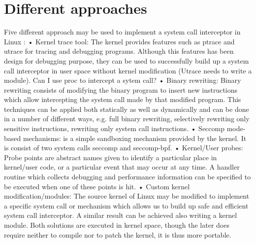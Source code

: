 \section{Different approaches }
Five different approach may be used to implement a system call interceptor in Linux :
•	Kernel trace tool:  The kernel provides features such as ptrace and utrace for tracing and debugging programs. Although this features has been design for debugging purpose, they can be used to successfully build up a system call interceptor in user space without kernel modification (Utrace needs to write a module). Can I use proc to intercept a sytem call?  
•	Binary rewriting:  Binary rewriting consists of modifying the binary program to insert new instructions which allow intercepting the system call made by that modified program. This techniques can be applied both statically as well as dynamically and can be done in a number of different ways, e.g. full binary rewriting, selectively rewriting only sensitive instructions, rewriting only system call instructions.
•	Seccomp mode-based mechanisms: is a simple sandboxing mechanism provided by the kernel. It is consist of two system calls seccomp and seccomp-bpf. 
•	Kernel/User probes: Probe points are abstract names given to identify a particular place in kernel/user code, or a particular event that may occur at any time. A handler routine which collects debugging and performance information can be specified to be executed when one of these points is hit. 
•	Custom kernel modification/modules: The source kernel of Linux may be modified to implement a specific system call or mechanism which allows us to build up safe and efficient system call interceptor. A similar result can be achieved also writing a kernel module. Both solutions are executed in kernel space, though the later does require neither to compile nor to patch the kernel, it is thus more portable.  

